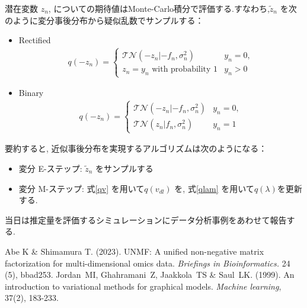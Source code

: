 \documentclass[a4paper,12ptc]{jsarticle} %
\begin{document}
潜在変数 $z_n$, についての期待値はMonte-Carlo積分で評価する.すなわち,$\tilde z_n$ を次のように変分事後分布から疑似乱数でサンプルする：
\begin{itemize}
\item Rectified
\begin{align}
q(-z_n) = \begin{cases}
    \mathcal{TN}(-z_n|-f_n, \sigma_n^2) & y_n=0,\\
    z_n = y_n \mbox{~with probability 1} & y_n>0
\end{cases}
\end{align}
\item Binary
\begin{align}
q(-z_n) = \begin{cases}
    \mathcal{TN}(-z_n|-f_n, \sigma_n^2) & y_n=0,\\
    \mathcal{TN}(z_n|f_n, \sigma_n^2) & y_n=1
\end{cases}
\end{align}
\end{itemize}

要約すると, 近似事後分布を実現するアルゴリズムは次のようになる：
\begin{itemize}
\item 変分 E-ステップ: $\tilde{z}_n$ をサンプルする 
\item 変分 M-ステップ:  式\ref{qv} を用いて$q(v_{dl})$ を, 式\ref{qlam} を用いて$q(\lambda)$を更新する. 
\end{itemize}

当日は推定量を評価するシミュレーションにデータ分析事例をあわせて報告する.

\begin{thebibliography}{9}
 Abe K \& Shimamura T. (2023). UNMF: A unified non-negative matrix factorization for multi-dimensional omics data. {\em Briefings in Bioinformatics.}  24 (5), bbad253.
 Jordan~MI, Ghahramani~Z, Jaakkola~TS \& Saul~LK. (1999). An introduction to variational methods for graphical models. {\em Machine learning}, 37(2), 183-233.
\end{thebibliography}
\end{document}
